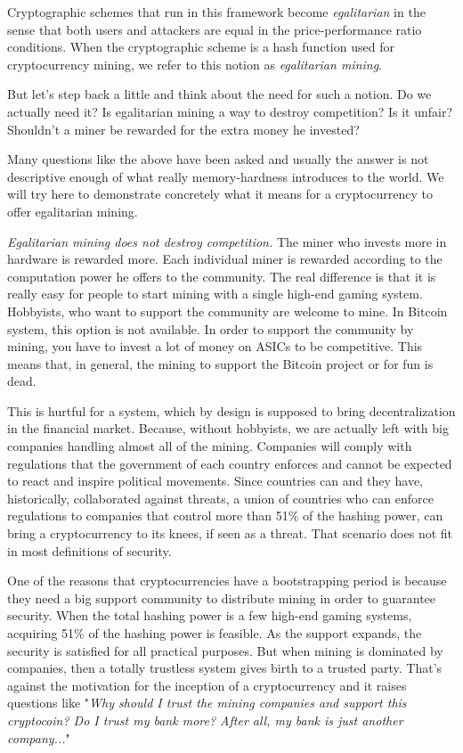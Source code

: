 Cryptographic schemes that run in this framework become \emph{egalitarian} in the sense that both users and attackers are equal in the price-performance ratio conditions. When the cryptographic scheme is a hash function used for cryptocurrency mining, we refer to this notion as \emph{egalitarian mining}.

But let's step back a little and think about the need for such a notion. Do we actually need it? Is egalitarian mining a way to destroy competition? Is it unfair? Shouldn't a miner be rewarded for the extra money he invested?

Many questions like the above have been asked and usually the answer is not descriptive enough of what really memory-hardness introduces to the world. We will try here to demonstrate concretely what it means for a cryptocurrency to offer egalitarian mining.

\emph{Egalitarian mining does not destroy competition.} The miner who invests more in hardware is rewarded more. Each individual miner is rewarded according to the computation power he offers to the community. The real difference is that it is really easy for people to start mining with a single high-end gaming system. Hobbyists, who want to support the community are welcome to mine. In Bitcoin system, this option is not available. In order to support the community by mining, you have to invest a lot of money on ASICs to be competitive. This means that, in general, the mining to support the Bitcoin project or for fun is dead.

This is hurtful for a system, which by design is supposed to bring decentralization in the financial market. Because, without hobbyists, we are actually left with big companies handling almost all of the mining. Companies will comply with regulations that the government of each country enforces and cannot be expected to react and inspire political movements. Since countries can and they have, historically, collaborated against threats, a union of countries who can enforce regulations to companies that control more than 51\% of the hashing power, can bring a cryptocurrency to its knees, if seen as a threat. That scenario does not fit in most definitions of security.
\pagebreak

One of the reasons that cryptocurrencies have a bootstrapping period is because they need a big support community to distribute mining in order to guarantee security. When the total hashing power is a few high-end gaming systems, acquiring 51\% of the hashing power is feasible. As the support expands, the security is satisfied for all practical purposes. But when mining is dominated by companies, then a totally trustless system gives birth to a trusted party. That's against the motivation for the inception of a cryptocurrency and it raises questions like "\emph{Why should I trust the mining companies and support this cryptocoin? Do I trust my bank more? After all, my bank is just another company...}"

